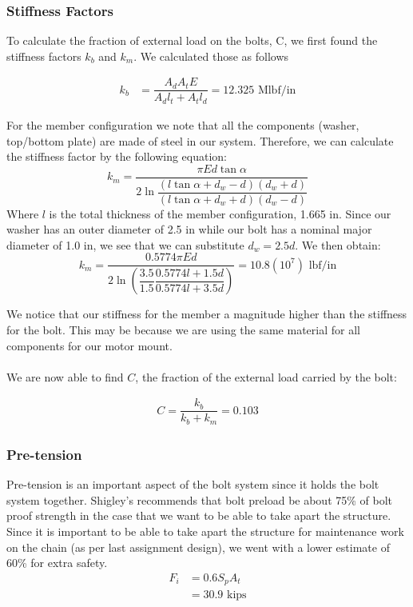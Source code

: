 \documentclass[letterpaper,12pt]{article}
\begin{document}
\subsubsection{Stiffness Factors}
To calculate the fraction of external load on the bolts, C, we first found the stiffness factors $k_{b}$ and $k_{m}$. We calculated those as follows

\begin{align*}
    k _ { b } &= \dfrac { A _ { d } A _ { t } E } { A _ { d } l _ { t } + A _ { t } l _ { d } }
    = 12.325 \text{ Mlbf/in} 
\end{align*}

\noindent For the member configuration we note that all the components (washer, top/bottom plate) are made of steel in our system. Therefore, we can calculate the stiffness factor by the following equation:
\begin{equation*}
    k _ { m } = \dfrac { \pi E d \tan \alpha } { 2 \ln \dfrac { \left( l \tan \alpha + d _ { w } - d \right) \left( d _ { w } + d \right) } { \left( l \tan \alpha + d _ { w } + d \right) \left( d _ { w } - d \right) } }
\end{equation*}
Where $l$ is the total thickness of the member configuration, 1.665 in. Since our washer has an outer diameter of 2.5 in while our bolt has a nominal major diameter of 1.0 in, we see that we can substitute $d_w = 2.5d$. We then obtain:
\begin{equation*}
    k _ { m } = \dfrac { 0.5774 \pi E d } { 2 \ln \left( \dfrac{3.5}{1.5} \dfrac { 0.5774 l + 1.5 d } { 0.5774 l + 3.5 d } \right) } = 10.8(10^7) \text{ lbf/in}
\end{equation*}

\noindent We notice that our stiffness for the member a magnitude higher than the stiffness for the bolt. This may be because we are using the same material for all components for our motor mount.\\\\
We are now able to find $C$, the fraction of the external load carried by the bolt:

\begin{align*}
    C = \dfrac { k _ { b } } { k _ { b } + k _ { m } } = 0.103
\end{align*}

\subsubsection{Pre-tension}
Pre-tension is an important aspect of the bolt system since it holds the bolt system together. Shigley's recommends that bolt preload be about 75\% of bolt proof strength in the case that we want to be able to take apart the structure. Since it is important to be able to take apart the structure for maintenance work on the chain (as per last assignment design), we went with a lower estimate of 60\% for extra safety.
\begin{align*}
    F_i &= 0.6S_pA_t\\
    &= 30.9 \text{ kips}
\end{align*}
\end{document}
